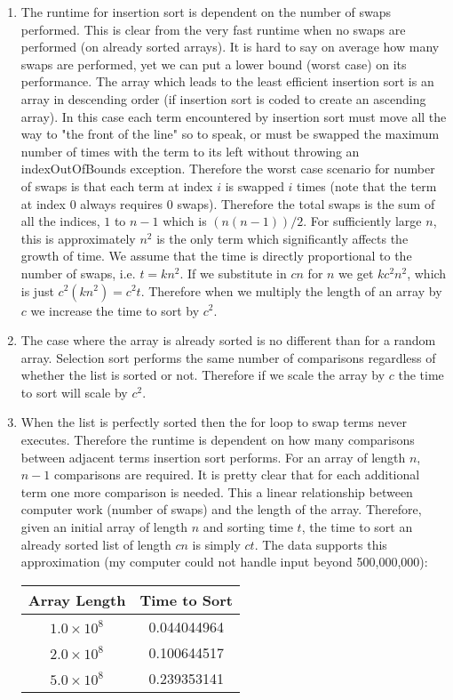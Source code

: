 \documentclass{article}
\begin{document}
\begin{enumerate}
		\item The runtime for insertion sort is dependent on the number of swaps performed. This is clear from the very fast runtime when no swaps are performed (on already sorted arrays). It is hard to say on average how many swaps are performed, yet we can put a lower bound (worst case) on its performance. The array which leads to the least efficient insertion sort is an array in descending order (if insertion sort is coded to create an ascending array). In this case each term encountered by insertion sort must move all the way to "the front of the line" so to speak, or must be swapped the maximum number of times with the term to its left without throwing an indexOutOfBounds exception. Therefore the worst case scenario for number of swaps is that each term at index $i$ is swapped $i$ times (note that the term at index 0 always requires 0 swaps). Therefore the total swaps is the sum of all the indices, $1$ to $n-1$ which is $ (n(n-1))/2$. For sufficiently large $n$, this is approximately $n^2$ is the only term which significantly affects the growth of time. We assume that the time is directly proportional to the number of swaps, i.e. $t = kn^2$.  If we substitute in $cn$ for $n$ we get $kc^2n^2$, which is just $c^2(kn^2) = c^2t$. Therefore when we multiply the length of an array by $c$ we increase the time to sort by $c^2$.  
		
		\item The case where the array is already sorted is no different than for a random array. Selection sort performs the same number of comparisons regardless of whether the list is sorted or not. Therefore if we scale the array by $c$ the time to sort will scale by $c^2$. 
		
		\item When the list is perfectly sorted then the for loop to swap terms never executes. Therefore the runtime is dependent on how many comparisons between adjacent terms insertion sort performs. For an array of length $n$, $n-1$ comparisons are required. It is pretty clear that for each additional term one more comparison is needed. This a linear relationship between computer work  (number of swaps) and the length of the array. Therefore, given an initial array of length $n$ and sorting time $t$, the time to sort an already sorted list of length $cn$ is simply $ct$. The data supports this approximation (my computer could not handle input beyond 500,000,000):
		\begin{center}
			\begin{tabular}{c | c}
				Array Length & Time to Sort \\
				\hline
				$ 1.0 \times 10^8 $ & 0.044044964\\
				$ 2.0 \times 10^8 $ & 0.100644517\\
				$ 5.0 \times 10^8 $ & 0.239353141\\
			\end{tabular}
		\end{center}
		

\end{enumerate}
\end{document}
